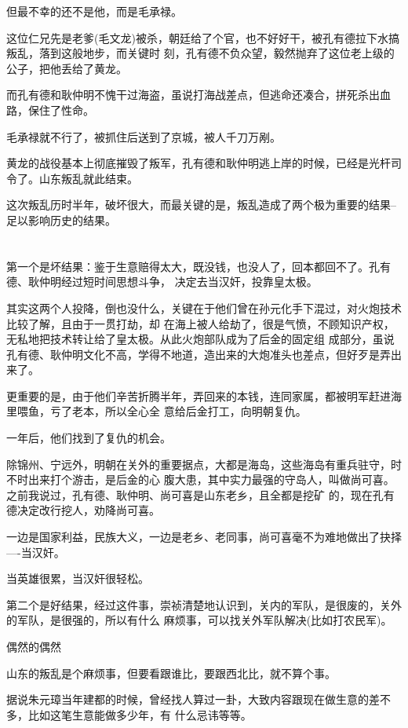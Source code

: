 \documentclass[11pt,a4paper,onecolumn]{article}
\begin{document}
但最不幸的还不是他，而是毛承禄。

这位仁兄先是老爹(毛文龙)被杀，朝廷给了个官，也不好好干，被孔有德拉下水搞叛乱，落到这般地步，而关键时
刻，孔有德不负众望，毅然抛弃了这位老上级的公子，把他丢给了黄龙。

而孔有德和耿仲明不愧干过海盗，虽说打海战差点，但逃命还凑合，拼死杀出血路，保住了性命。

毛承禄就不行了，被抓住后送到了京城，被人千刀万剐。

黄龙的战役基本上彻底摧毁了叛军，孔有德和耿仲明逃上岸的时候，已经是光杆司令了。山东叛乱就此结束。

这次叛乱历时半年，破坏很大，而最关键的是，叛乱造成了两个极为重要的结果--足以影响历史的结果。

\section[\thesection]{}

第一个是坏结果：鉴于生意赔得太大，既没钱，也没人了，回本都回不了。孔有德、耿仲明经过短时间思想斗争，
决定去当汉奸，投靠皇太极。

其实这两个人投降，倒也没什么，关键在于他们曾在孙元化手下混过，对火炮技术比较了解，且由于一贯打劫，却
在海上被人给劫了，很是气愤，不顾知识产权，无私地把技术转让给了皇太极。从此火炮部队成为了后金的固定组
成部分，虽说孔有德、耿仲明文化不高，学得不地道，造出来的大炮准头也差点，但好歹是弄出来了。

更重要的是，由于他们辛苦折腾半年，弄回来的本钱，连同家属，都被明军赶进海里喂鱼，亏了老本，所以全心全
意给后金打工，向明朝复仇。

一年后，他们找到了复仇的机会。

除锦州、宁远外，明朝在关外的重要据点，大都是海岛，这些海岛有重兵驻守，时不时出来打个游击，是后金的心
腹大患，其中实力最强的守岛人，叫做尚可喜。之前我说过，孔有德、耿仲明、尚可喜是山东老乡，且全都是挖矿
的，现在孔有德决定改行挖人，劝降尚可喜。

一边是国家利益，民族大义，一边是老乡、老同事，尚可喜毫不为难地做出了抉择----当汉奸。

当英雄很累，当汉奸很轻松。

第二个是好结果，经过这件事，崇祯清楚地认识到，关内的军队，是很废的，关外的军队，是很强的，所以有什么
麻烦事，可以找关外军队解决(比如打农民军)。

偶然的偶然

山东的叛乱是个麻烦事，但要看跟谁比，要跟西北比，就不算个事。

据说朱元璋当年建都的时候，曾经找人算过一卦，大致内容跟现在做生意的差不多，比如这笔生意能做多少年，有
什么忌讳等等。
\end{document}

